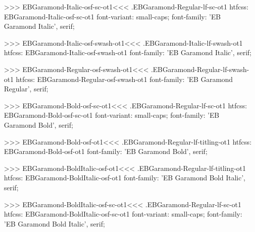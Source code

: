 {{{{{{{>>>
\<EBGaramond-Italic-osf-sc-ot1\><<<
.EBGaramond-Regular-lf-sc-ot1
htfcss:  EBGaramond-Italic-osf-sc-ot1  font-variant: small-caps; font-family: 'EB Garamond Italic', serif;

>>>
\<EBGaramond-Italic-osf-swash-ot1\><<<
.EBGaramond-Italic-lf-swash-ot1
htfcss:  EBGaramond-Italic-osf-swash-ot1  font-family: 'EB Garamond Italic', serif;

>>>
\<EBGaramond-Regular-osf-swash-ot1\><<<
.EBGaramond-Regular-lf-swash-ot1
htfcss:  EBGaramond-Regular-osf-swash-ot1  font-family: 'EB Garamond Regular', serif;

>>>
\<EBGaramond-Bold-osf-sc-ot1\><<<
.EBGaramond-Regular-lf-sc-ot1
htfcss:  EBGaramond-Bold-osf-sc-ot1  font-variant: small-caps; font-family: 'EB Garamond Bold', serif;

>>>
\<EBGaramond-Bold-osf-ot1\><<<
.EBGaramond-Regular-lf-titling-ot1
htfcss:  EBGaramond-Bold-osf-ot1  font-family: 'EB Garamond Bold', serif;

>>>
\<EBGaramond-BoldItalic-osf-ot1\><<<
.EBGaramond-Regular-lf-titling-ot1
htfcss:  EBGaramond-BoldItalic-osf-ot1  font-family: 'EB Garamond Bold Italic', serif;

>>>
\<EBGaramond-BoldItalic-osf-sc-ot1\><<<
.EBGaramond-Regular-lf-sc-ot1
htfcss:  EBGaramond-BoldItalic-osf-sc-ot1  font-variant: small-caps; font-family: 'EB Garamond Bold Italic', serif;

}}}}}}}
